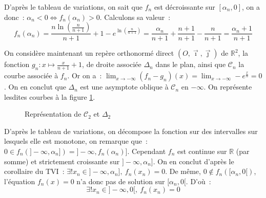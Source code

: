 \documentclass{article}
\begin{document}
  D'après le tableau de variations, on sait que $f_n$ est décroissante sur $[\alpha_n, 0]$, on a donc~: $\alpha_n<0\iff f_n(\alpha_n)>0$. Calculons sa valeur~:
  \begin{displaymath}
    f_n(\alpha_n)=\frac{n\ln\left(\frac{n}{n+1}\right)}{n+1}+1-e^{\ln\left(\frac{n}{n+1}\right)}=\frac{\alpha_n}{n+1}+\frac{n+1}{n+1}-\frac{n}{n+1}=\frac{\alpha_n+1}{n+1}
  \end{displaymath}

  On considère maintenant un repère orthonormé direct $(O,\vec\imath,\vec\jmath)$ de $\mathbb{R}^2$, la fonction $g_n:x\mapsto\frac{x}{n+1}+1$, de droite associée $\Delta_n$ dans le plan, ainsi que $\mathscr{C}_n$ la courbe associée à $f_n$. Or on a~: $\lim_{x\to -\infty}(f_n-g_n)(x)=\lim_{x\to -\infty}-e^\frac{x}{n}=0$. On en conclut que $\Delta_n$ est une asymptote oblique à $\mathscr{C}_n$ en $-\infty$. On représente lesdites courbes à la figure \ref{C2D2}.
  \begin{figure}[ht]
    \begin{center}
    \end{center}
    \caption{Représentation de $\mathscr{C}_2$ et $\Delta_2$}
    \label{C2D2}
  \end{figure}

  D'après le tableau de variations, on décompose la fonction sur des intervalles sur lesquels elle est monotone, on remarque que~: $0\in f_n(]-\infty, \alpha_n])=]-\infty,f_n(\alpha_n)]$. Cependant $f_n$ est continue sur $\mathbb{R}$ (par somme) et strictement croissante sur $]-\infty, \alpha_n]$. On en conclut d'après le corollaire du TVI~: $\exists! x_n\in]-\infty, \alpha_n],\ f_n(x_n)=0$. De même, $0\not\in f_n([\alpha_n, 0[)$, l'équation $f_n(x)=0$ n'a donc pas de solution sur $[\alpha_n, 0[$. D'où~:
  \begin{displaymath}
    \exists! x_n\in]-\infty, 0[,\ f_n(x_n)=0
  \end{displaymath}
\end{document}
